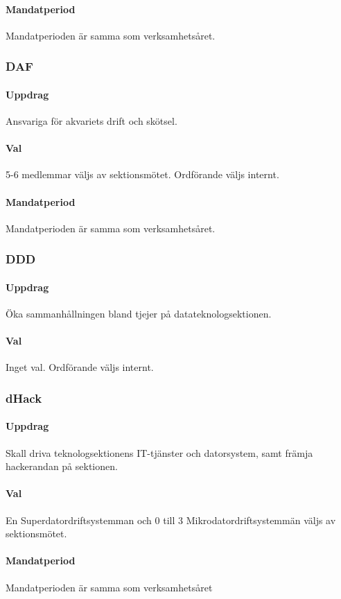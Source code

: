 \paragraph{Mandatperiod}
Mandatperioden är samma som verksamhetsåret. 
\subsubsection{DAF}
\paragraph{Uppdrag}
Ansvariga för akvariets drift och skötsel. 
\paragraph{Val}
5-6 medlemmar väljs av sektionsmötet. Ordförande väljs internt.
\paragraph{Mandatperiod}
Mandatperioden är samma som verksamhetsåret.
\subsubsection{DDD}
\paragraph{Uppdrag}
Öka sammanhållningen bland tjejer på datateknologsektionen. 
\paragraph{Val}
Inget val. Ordförande väljs internt.
\subsubsection{dHack}
\paragraph{Uppdrag}
Skall driva teknologsektionens IT-tjänster och datorsystem, samt
främja hackerandan på sektionen.
\paragraph{Val}
En Superdatordriftsystemman och 0 till 3 Mikrodatordriftsystemmän väljs av sektionsmötet.
\paragraph{Mandatperiod}
Mandatperioden är samma som verksamhetsåret
